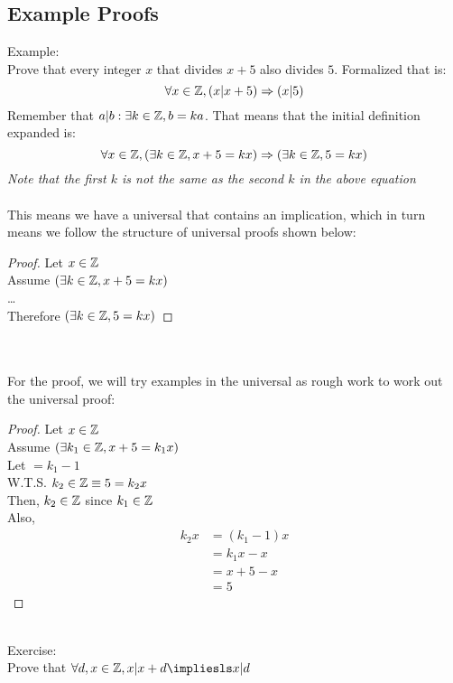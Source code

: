 \documentclass[12pt, letterpaper, twoside]{article}
\begin{document}

\subsection{Example Proofs}
Example:\\
Prove that every integer $x$ that divides $x + 5$ also divides $5$. Formalized that is:
$$
\forall x \in \mathbb Z, (x | x + 5) \mathrel{\Rightarrow} (x | 5)
$$
Remember that $a|b : \exists k \in \mathbb Z, b = ka$. That means that the initial definition expanded is:
$$
\forall x \in \mathbb Z, (\exists k \in \mathbb Z, x + 5 = kx) \mathrel{\Rightarrow} (\exists k \in \mathbb Z, 5 = kx)
$$
\hspace*{5mm}\textit{Note that the first $k$ is not the same as the second $k$ in the above equation}
\\
\\
This means we have a universal that contains an implication, which in turn means we follow the structure of universal proofs shown below:
\begin{proof}
	Let $x \in \mathbb Z$\\
	\hspace*{17mm}Assume $(\exists k \in \mathbb Z, x + 5 = kx)$\\
	\hspace*{17mm}\dots\\
	\hspace*{17mm}Therefore $(\exists k \in \mathbb Z, 5 = kx)$
\end{proof}\\
\\
For the proof, we will try examples in the universal as rough work to work out the universal proof:
\begin{proof}
	Let $x \in \mathbb Z$\\
	\hspace*{17mm}Assume $(\exists k_1 \in \mathbb Z, x + 5 = k_1x)$\\
	\hspace*{17mm}Let $ = k_1 - 1$\\
	\hspace*{17mm}W.T.S. $k_2 \in \mathbb Z \equiv 5 = k_2x$\\
	\hspace*{17mm}Then, $k_2 \in \mathbb Z$ since $k_1 \in \mathbb Z$\\
	\hspace*{17mm}Also,\\
	\begin{align*}
		k_2x &= (k_1 - 1)x\\
		&= k_1x - x\\
		&= x + 5 - x\\
		&= 5
	\end{align*}
\end{proof}
\\
Exercise:\\
Prove that $\forall d, x \in \Z, x | x + d \impliesls x | d$
\end{document}
